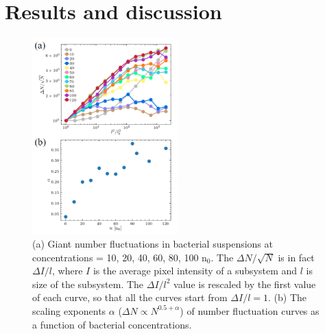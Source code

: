 \documentclass[twocolumn,aps,pre,amsmath,amssymb,floatfix,longbibliography]{revtex4-1}
\begin{document}
\section{Results and discussion}



\begin{figure}[!]
\begin{center}
\includegraphics[width=0.5\textwidth]{GNF-figures-3-v2.png}
\caption[]{(a) Giant number fluctuations in bacterial suspensions at concentrations = 10, 20, 40, 60, 80, 100 n$_0$. The $\Delta N/\sqrt{N}$ is in fact $\Delta I/l$, where $I$ is the average pixel intensity of a subsystem and $l$ is size of the subsystem. The $\Delta I/l^2$ value is rescaled by the first value of each curve, so that all the curves start from $\Delta I/l=1$. (b) The scaling exponents $\alpha$ ($\Delta N \propto N^{0.5+\alpha}$) of number fluctuation curves as a function of bacterial concentrations.}
\label{fig:3}
\end{center}
\end{figure}
\end{document}
